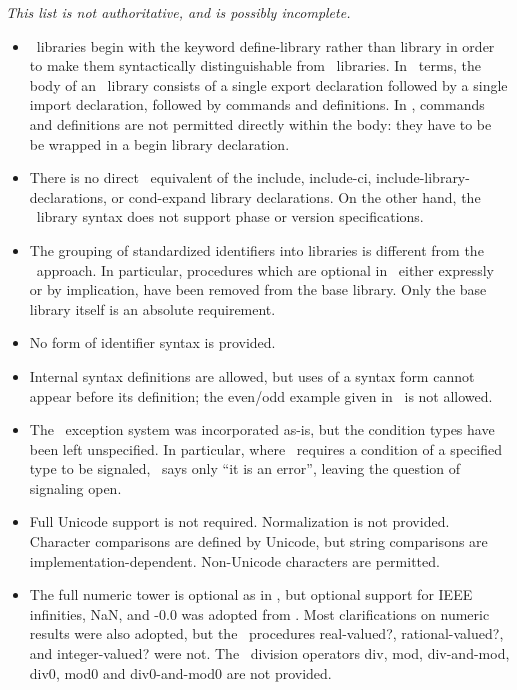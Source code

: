 {\em This list is not authoritative, and is possibly incomplete.}

\begin{itemize}
\item \rsevenrs\ libraries begin with the keyword {\cf define-library}
rather than {\cf library} in order to make them syntactically
distinguishable from \rsixrs\ libraries.
In \rsevenrs\ terms, the body of an \rsixrs\ library consists
of a single export declaration followed by a single import declaration,
followed by commands and definitions.  In \rsevenrs, commands and
definitions are not permitted directly within the body: they have to be be wrapped in a {\cf begin}
library declaration.

\item There is no direct \rsixrs\ equivalent of the {\cf include}, {\cf include-ci},
{\cf include-library-declarations}, or {\cf cond-expand} library declarations.
On the other hand, the \rsevenrs\ library syntax does not support phase or version specifications.

\item The grouping of standardized identifiers into libraries is different from the \rsixrs\
approach. In particular, procedures which are optional in \rfivers\, either expressly
or by implication, have been removed from the base library.
Only the base library itself is an absolute requirement.

\item No form of identifier syntax is provided. 

\item Internal syntax definitions are allowed, but uses of a syntax form
cannot appear before its definition; the {\cf even}/{\cf odd} example given in
\rsixrs\ is not allowed.

\item The \rsixrs\ exception system was incorporated as-is, but the condition
types have been left unspecified.  In particular, where \rsixrs\ requires
a condition of a specified type to be signaled, \rsevenrs\ says only
``it is an error'', leaving the question of signaling open.

\item Full Unicode support is not required.
Normalization is not provided.
Character comparisons are
defined by Unicode, but string comparisons are implementation-dependent.
Non-Unicode characters are permitted.

\item The full numeric tower is optional as in \rfivers, but optional support for IEEE
infinities, NaN, and {\mbox -0.0} was adopted from \rsixrs. Most clarifications on
numeric results were also adopted, but the \rsixrs\ procedures {\cf real-valued?},
{\cf rational-valued?}, and {\cf integer-valued}? were not. 
The \rsixrs\ division operators {\cf div}, {\cf mod}, {\cf div-and-mod}, {\cf
div0}, {\cf mod0} and {\cf div0-and-mod0} are not provided.


\end{itemize}
